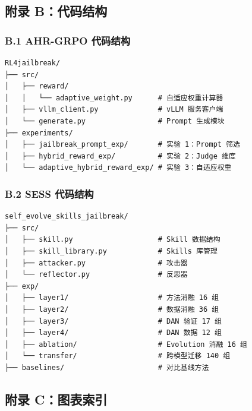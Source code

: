 \documentclass[12pt,a4paper]{article}
\begin{document}
\subsection{附录 B：代码结构}

\subsubsection{B.1 AHR-GRPO 代码结构}

\begin{verbatim}
RL4jailbreak/
├── src/
│   ├── reward/
│   │   └── adaptive_weight.py      # 自适应权重计算器
│   ├── vllm_client.py              # vLLM 服务客户端
│   └── generate.py                 # Prompt 生成模块
├── experiments/
│   ├── jailbreak_prompt_exp/       # 实验 1：Prompt 筛选
│   ├── hybrid_reward_exp/          # 实验 2：Judge 维度
│   └── adaptive_hybrid_reward_exp/ # 实验 3：自适应权重
\end{verbatim}

\subsubsection{B.2 SESS 代码结构}

\begin{verbatim}
self_evolve_skills_jailbreak/
├── src/
│   ├── skill.py                    # Skill 数据结构
│   ├── skill_library.py            # Skills 库管理
│   ├── attacker.py                 # 攻击器
│   └── reflector.py                # 反思器
├── exp/
│   ├── layer1/                     # 方法消融 16 组
│   ├── layer2/                     # 数据消融 36 组
│   ├── layer3/                     # DAN 验证 17 组
│   ├── layer4/                     # DAN 数据 12 组
│   ├── ablation/                   # Evolution 消融 16 组
│   └── transfer/                   # 跨模型迁移 140 组
├── baselines/                      # 对比基线方法
\end{verbatim}

\subsection{附录 C：图表索引}
\end{document}
